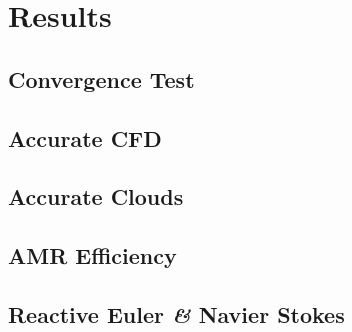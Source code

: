 \chapter{Results}
\section{Convergence Test}
\section{Accurate CFD}
\section{Accurate Clouds}
\section{AMR Efficiency}
\section{Reactive Euler \textit{\&} Navier Stokes}

